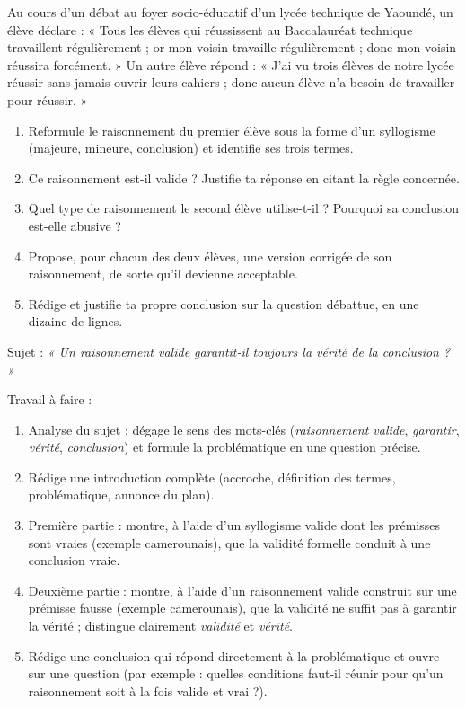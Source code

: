 \documentclass[11pt]{article}
\begin{document}
\begin{exercice}
Au cours d'un débat au foyer socio-éducatif d'un lycée technique de Yaoundé, un élève déclare : « Tous les élèves qui réussissent au Baccalauréat technique travaillent régulièrement ; or mon voisin travaille régulièrement ; donc mon voisin réussira forcément. » Un autre élève répond : « J'ai vu trois élèves de notre lycée réussir sans jamais ouvrir leurs cahiers ; donc aucun élève n'a besoin de travailler pour réussir. »
\begin{enumerate}
\item Reformule le raisonnement du premier élève sous la forme d'un syllogisme (majeure, mineure, conclusion) et identifie ses trois termes.
\item Ce raisonnement est-il valide ? Justifie ta réponse en citant la règle concernée.
\item Quel type de raisonnement le second élève utilise-t-il ? Pourquoi sa conclusion est-elle abusive ?
\item Propose, pour chacun des deux élèves, une version corrigée de son raisonnement, de sorte qu'il devienne acceptable.
\item Rédige et justifie ta propre conclusion sur la question débattue, en une dizaine de lignes.
\end{enumerate}
\end{exercice}

\begin{exercice}
Sujet : \emph{« Un raisonnement valide garantit-il toujours la vérité de la conclusion ? »}

Travail à faire :
\begin{enumerate}
\item Analyse du sujet : dégage le sens des mots-clés (\emph{raisonnement valide}, \emph{garantir}, \emph{vérité}, \emph{conclusion}) et formule la problématique en une question précise.
\item Rédige une introduction complète (accroche, définition des termes, problématique, annonce du plan).
\item Première partie : montre, à l'aide d'un syllogisme valide dont les prémisses sont vraies (exemple camerounais), que la validité formelle conduit à une conclusion vraie.
\item Deuxième partie : montre, à l'aide d'un raisonnement valide construit sur une prémisse fausse (exemple camerounais), que la validité ne suffit pas à garantir la vérité ; distingue clairement \emph{validité} et \emph{vérité}.
\item Rédige une conclusion qui répond directement à la problématique et ouvre sur une question (par exemple : quelles conditions faut-il réunir pour qu'un raisonnement soit à la fois valide et vrai ?).
\end{enumerate}
\end{exercice}
\end{document}
